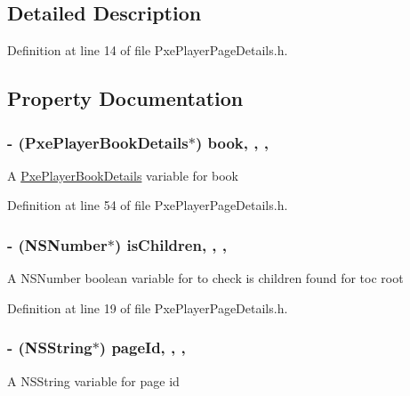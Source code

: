\subsection{Detailed Description}


Definition at line 14 of file Pxe\-Player\-Page\-Details.\-h.



\subsection{Property Documentation}
\hypertarget{interface_pxe_player_page_details_a6f45840f71adb8e50bd8f077d4368db6}{
\subsubsection[{book}]{\setlength{\rightskip}{0pt plus 5cm}-\/ ({\bf Pxe\-Player\-Book\-Details}$\ast$) book\hspace{0.3cm}{\ttfamily [read]}, {\ttfamily [write]}, {\ttfamily [nonatomic]}, {\ttfamily [retain]}}}\label{interface_pxe_player_page_details_a6f45840f71adb8e50bd8f077d4368db6}
A \hyperlink{interface_pxe_player_book_details}{Pxe\-Player\-Book\-Details} variable for book 

Definition at line 54 of file Pxe\-Player\-Page\-Details.\-h.

\hypertarget{interface_pxe_player_page_details_a014167c06505941bf9634f8038b077d6}{
\subsubsection[{is\-Children}]{\setlength{\rightskip}{0pt plus 5cm}-\/ (N\-S\-Number$\ast$) is\-Children\hspace{0.3cm}{\ttfamily [read]}, {\ttfamily [write]}, {\ttfamily [nonatomic]}, {\ttfamily [retain]}}}\label{interface_pxe_player_page_details_a014167c06505941bf9634f8038b077d6}
A N\-S\-Number boolean variable for to check is children found for toc root 

Definition at line 19 of file Pxe\-Player\-Page\-Details.\-h.

\hypertarget{interface_pxe_player_page_details_a5a67b53e316c637fb9f251efc06dbb0a}{
\subsubsection[{page\-Id}]{\setlength{\rightskip}{0pt plus 5cm}-\/ (N\-S\-String$\ast$) page\-Id\hspace{0.3cm}{\ttfamily [read]}, {\ttfamily [write]}, {\ttfamily [nonatomic]}, {\ttfamily [retain]}}}\label{interface_pxe_player_page_details_a5a67b53e316c637fb9f251efc06dbb0a}
A N\-S\-String variable for page id 


